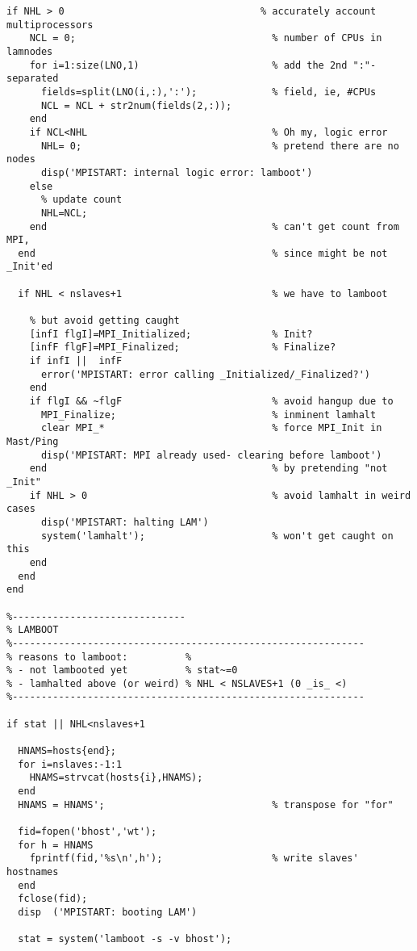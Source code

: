 \begin{lstlisting}[linerange={1-1,16-325}]
  if NHL > 0                                  % accurately account multiprocessors
    NCL = 0;                                  % number of CPUs in lamnodes
    for i=1:size(LNO,1)                       % add the 2nd ":"-separated
      fields=split(LNO(i,:),':');             % field, ie, #CPUs
      NCL = NCL + str2num(fields(2,:));
    end
    if NCL<NHL                                % Oh my, logic error
      NHL= 0;                                 % pretend there are no nodes
      disp('MPISTART: internal logic error: lamboot')
    else
      % update count
      NHL=NCL;                                
    end                                       % can't get count from MPI, 
  end                                         % since might be not _Init'ed

  if NHL < nslaves+1                          % we have to lamboot

    % but avoid getting caught
    [infI flgI]=MPI_Initialized;              % Init?
    [infF flgF]=MPI_Finalized;                % Finalize?
    if infI ||  infF
      error('MPISTART: error calling _Initialized/_Finalized?')
    end
    if flgI && ~flgF                          % avoid hangup due to
      MPI_Finalize;                           % inminent lamhalt
      clear MPI_*                             % force MPI_Init in Mast/Ping
      disp('MPISTART: MPI already used- clearing before lamboot')
    end                                       % by pretending "not _Init"
    if NHL > 0                                % avoid lamhalt in weird cases
      disp('MPISTART: halting LAM')
      system('lamhalt');                      % won't get caught on this
    end
  end
end

%------------------------------
% LAMBOOT
%-------------------------------------------------------------
% reasons to lamboot:          %
% - not lambooted yet          % stat~=0
% - lamhalted above (or weird) % NHL < NSLAVES+1 (0 _is_ <)
%-------------------------------------------------------------

if stat || NHL<nslaves+1

  HNAMS=hosts{end};
  for i=nslaves:-1:1
    HNAMS=strvcat(hosts{i},HNAMS); 
  end
  HNAMS = HNAMS';                             % transpose for "for"

  fid=fopen('bhost','wt');
  for h = HNAMS
    fprintf(fid,'%s\n',h');                   % write slaves' hostnames
  end        
  fclose(fid);
  disp  ('MPISTART: booting LAM')

  stat = system('lamboot -s -v bhost');


\end{lstlisting}
